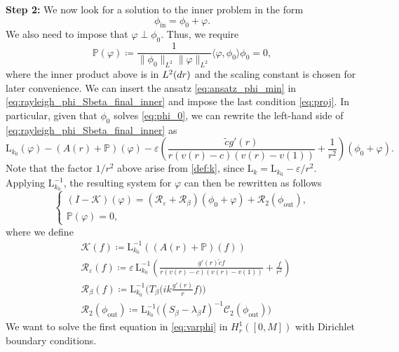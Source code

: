 \documentclass[11pt,reqno]{amsproc}
\def\dd{{\rm d}}
\def\eps{\varepsilon}
\newcommand{\rmin}{\mathrm{in}}
\newcommand{\rmout}{\mathrm{out}}
\newcommand{\rmL}{\mathrm{L}}
\newcommand{\cK}{\mathcal{K}}
\newcommand{\cR}{\mathcal{R}}
\theoremstyle{definition}
\theoremstyle{definition}
\numberwithin{equation}{section}
\begin{document}
\textbf{Step 2:} 
We now look for a solution to the inner problem in the form 
\begin{equation}
\label{eq:ansatz_phi_min}
\phi_{\rmin}=\phi_0+\varphi.
\end{equation}
We also need to impose that $\varphi\perp \phi_0$. Thus, we require  
\begin{equation}
\label{eq:proj} 
\mathbb{P}(\varphi)\coloneqq\frac{1}{\|\phi_0\|_{L^2}\|\varphi\|_{L^2}}\langle{\varphi,\phi_0}\rangle\phi_0=0,
\end{equation}
where the inner product above is in $L^2(\dd r)$ and the scaling constant is chosen for later convenience.
We can  insert the ansatz \cref{eq:ansatz_phi_min} in \cref{eq:rayleigh_phi_Sbeta_final_inner} and 
impose the last condition \cref{eq:proj}. In particular, given that $\phi_0$ solves \cref{eq:phi_0}, we can rewrite the left-hand side of \cref{eq:rayleigh_phi_Sbeta_final_inner} as 
\begin{equation}
    \rmL_{k_0}(\varphi)-(A(r)+\mathbb{P})(\varphi)-\eps\left(\frac{\tilde{c} g'(r)}{r(v(r)-c)(v(r)-v(1))}+\frac{1}{r^2}\right)(\phi_0+\varphi).
\end{equation}
Note that the factor $1/r^2$ above arise from \cref{def:k}, since $\rmL_{k}=\rmL_{k_0}-\eps/r^2$.
Applying $\rmL_{k_0}^{-1}$, the resulting system for $\varphi$ can then be rewritten as follows
\begin{equation}
   \label{eq:varphi}
    \begin{cases}
        (I-\cK)(\varphi)=(\cR_{\eps}+\cR_\beta)(\phi_0+\varphi)+\cR_{2}(\phi_{\rmout}),\\
        \mathbb{P}(\varphi)=0,
    \end{cases}
\end{equation}
where we define 
\begin{align}
    \label{def:K} &\cK(f)\coloneqq\rmL_{k_0}^{-1}((A(r)+\mathbb{P})(f))\\
   \label{def:cReps} &\cR_{\eps}(f)\coloneqq\eps \, \rmL_{k_0}^{-1}\left(\frac{g'(r)\tilde c f}{r(v(r)-c)(v(r)-v(1))}+\frac{f}{r^2}\right)\\
   \label{def:cRbeta} &\cR_{\beta}(f)\coloneqq\rmL_{k_0}^{-1}\big( T_\beta \big(ik  \frac{g'(r)}{r} f\big)\big)\\
&\cR_{2}(\phi_{\rmout})\coloneqq\rmL_{k_0}^{-1}\big((S_\beta-\lambda_\beta I)^{-1}\mathcal{C}_2(\phi_{\rmout})\big)
\end{align}
We want to solve  the first equation in \cref{eq:varphi} in $H^1_r([0,M])$ with Dirichlet boundary conditions.
\end{document}
